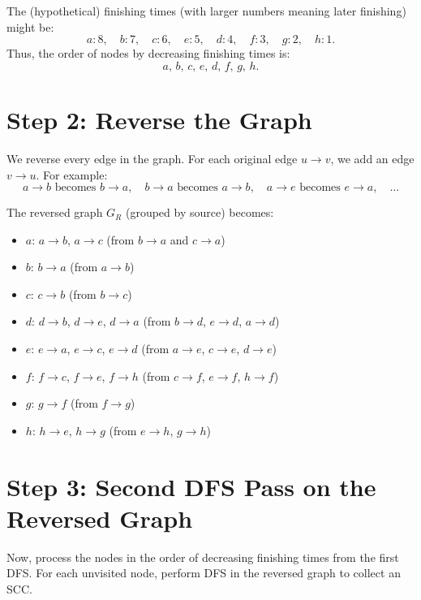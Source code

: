 \documentclass{article}
\begin{document}
The (hypothetical) finishing times (with larger numbers meaning later finishing) might be:
\[
a: 8,\quad b: 7,\quad c: 6,\quad e: 5,\quad d: 4,\quad f: 3,\quad g: 2,\quad h: 1.
\]
Thus, the order of nodes by decreasing finishing times is:
\[
a,\, b,\, c,\, e,\, d,\, f,\, g,\, h.
\]

\section{Step 2: Reverse the Graph}
We reverse every edge in the graph. For each original edge \( u \to v \), we add an edge \( v \to u \). For example:
\[
a \to b \text{ becomes } b \to a,\quad b \to a \text{ becomes } a \to b,\quad a \to e \text{ becomes } e \to a, \quad \ldots
\]

The reversed graph \( G_R \) (grouped by source) becomes:
\begin{itemize}
    \item \textbf{\(a\)}: \(a \to b\), \(a \to c\) \quad (from \(b \to a\) and \(c \to a\))
    \item \textbf{\(b\)}: \(b \to a\) \quad (from \(a \to b\))
    \item \textbf{\(c\)}: \(c \to b\) \quad (from \(b \to c\))
    \item \textbf{\(d\)}: \(d \to b\), \(d \to e\), \(d \to a\) \quad (from \(b \to d\), \(e \to d\), \(a \to d\))
    \item \textbf{\(e\)}: \(e \to a\), \(e \to c\), \(e \to d\) \quad (from \(a \to e\), \(c \to e\), \(d \to e\))
    \item \textbf{\(f\)}: \(f \to c\), \(f \to e\), \(f \to h\) \quad (from \(c \to f\), \(e \to f\), \(h \to f\))
    \item \textbf{\(g\)}: \(g \to f\) \quad (from \(f \to g\))
    \item \textbf{\(h\)}: \(h \to e\), \(h \to g\) \quad (from \(e \to h\), \(g \to h\))
\end{itemize}

\section{Step 3: Second DFS Pass on the Reversed Graph}
Now, process the nodes in the order of decreasing finishing times from the first DFS. For each unvisited node, perform DFS in the reversed graph to collect an SCC.
\end{document}
